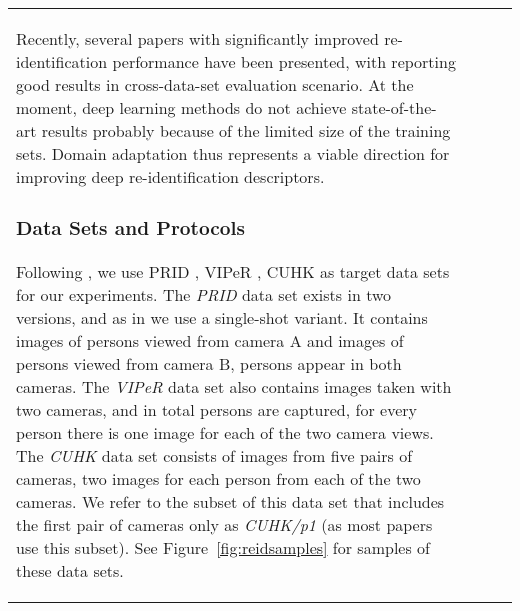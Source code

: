 \documentclass[twoside,11pt]{article}
\newcommand{\fig}[1]{Figure~\ref{fig:#1}}
\begin{document}
\begin{table*}[t]
{\begin{tabular}{lccc}
Recently, several papers  with significantly improved re-identification performance \citep{ZhangS14a,ZhaoOW14,Paisitkriangkrai15} have been presented, with \citet{MaLYL15} reporting good results in cross-data-set evaluation scenario. At the moment, deep learning methods \citep{YiLL14} do not achieve state-of-the-art results probably because of the limited size of the training sets. Domain adaptation thus represents a viable direction for improving deep re-identification descriptors.

\subsubsection{Data Sets and Protocols} 

Following \citet{MaLYL15}, we use PRID \citep{Hirzer_h.:person}, VIPeR \citep{Gray07evaluatingappearance}, CUHK \citep{LiW13} as target data sets for our experiments.  The \textit{PRID} data set exists in two versions, and as in \citet{MaLYL15} we use a single-shot variant. It contains images of  persons viewed from camera A and images of  persons viewed from camera B,   persons appear in both cameras. The \textit{VIPeR} data set also contains images taken with two cameras, and in total  persons are captured, for every person there is one image for each of the two camera views. The \textit{CUHK} data set consists of images from five pairs of cameras, two images for each person from each of the two cameras. We refer to the subset of this data set that includes the first pair of cameras only as \textit{CUHK/p1} (as most papers use this subset).
See \fig{reidsamples} for samples of these data sets.


\newlength\reidheight
\setlength{\reidheight}{2.5cm}

\addtolength{\tabcolsep}{-3pt}


\end{tabular}}
\end{table*}
\end{document}
